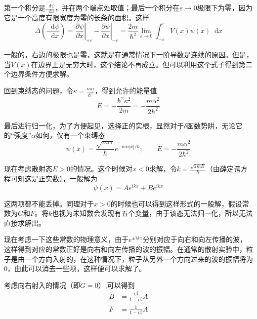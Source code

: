 \documentclass[UTF8]{ctexart}
\begin{document}
\noindent 第一个积分是$\frac{\mathop{}\!\mathrm{d} \psi}{\mathop{}\!\mathrm{d} x}$，并在两个端点处取值；最后一个积分在$\varepsilon \to 0$极限下为零，因为它是一个高度有限宽度为零的长条的面积。这样
\begin{equation}
    \Delta \left(\frac{\mathop{}\!\mathrm{d}  \psi }{\mathop{}\!\mathrm{d} x}\right) = \left.\frac{\partial \psi}{\partial x}\right|_{+\varepsilon}-\left.\frac{\partial \psi}{\partial x}\right|_{-\varepsilon}=\frac{2 m}{\hbar^{2}} \lim _{\varepsilon \rightarrow 0} \int_{-\varepsilon}^{\varepsilon} V(x) \psi(x) \mathop{}\!\mathrm{d}  x
\end{equation}

\noindent 一般的，右边的极限也是零，这就是在通常情况下一阶导数是连续的原因。但是，当$V(x)$在边界上是无穷大时，这个结论不再成立。但可以利用这个式子得到第二个边界条件方便求解。

    回到束缚态的问题，令$\kappa = \frac{m \alpha}{\hbar^2}$，得到允许的能量值
    \begin{equation}
        E = -\frac{\hbar^2 \kappa^2}{2m} = -\frac{m \alpha^2}{2 \hbar^2}
    \end{equation}

\noindent 最后进行归一化，为了方便起见，选择正的实根，显然对于$\delta$函数势阱，无论它的“强度”$\alpha$如何，仅有一个束缚态
\begin{equation}
    \psi(x) = \frac{\sqrt{m \alpha}}{\hbar} e^{-m \alpha |x| / \hbar}; \qquad E= - \frac{m \alpha^2}{2 \hbar^2}
\end{equation}

    现在考虑散射态$E>0$的情况。这个时候对$x<0$求解，令$k = \frac{\sqrt{2 m E}}{\hbar}$（由薛定谔方程可知这是正实数），一般解为
    \begin{equation}
        \psi(x) = A e^{i k x} + B e^{ikx}
    \end{equation}

\noindent 这两项都不能丢掉。同理对于$x>0$的时候也可以得到这样形式的一般解，假设常数为$G$和$F$。将$k$也视为未知数会发现有五个变量，由于该态无法归一化，所以无法直接求解出。

    现在考虑一下这些常数的物理意义，由于$e^{\pm i k x}$分别对应于向右和向左传播的波，这样得到对应的常数正好是向右和向左传播的波的振幅。在通常的散射实验中，粒子是由一个方向入射的，在这种情况下，粒子从另外一个方向过来的波的振幅将为0，由此可以消去一些项，这样便可以求解了。

    考虑向右射入的情况（即$G=0$）,可以得到
    \begin{equation}
        \begin{aligned}
            B &= \frac{i \beta}{1 - i \beta} A \\
            F &= \frac{1}{1-i \beta} A
        \end{aligned}
    \end{equation}
\end{document}
